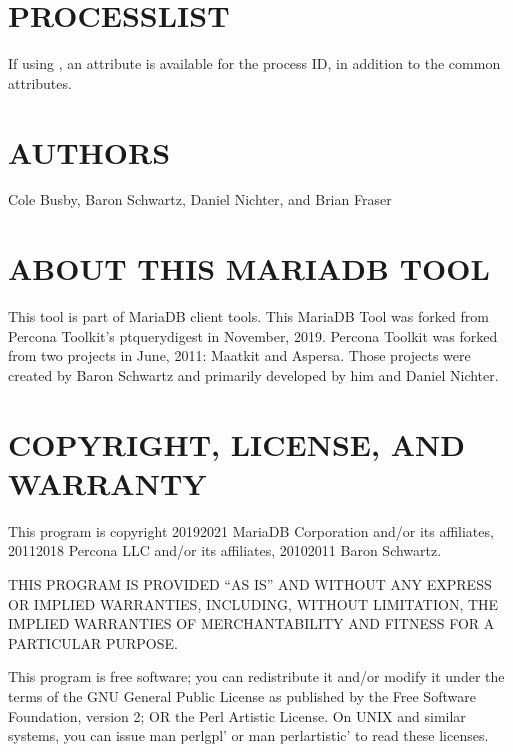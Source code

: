 \documentclass[letterpaper,10pt,english]{sphinxmanual}
\begin{document}
\section{PROCESSLIST}
\label{\detokenize{mariadb-query-digest:processlist}}
\sphinxAtStartPar
If using {\hyperref[\detokenize{mariadb-query-digest:cmdoption-mariadb-query-digest-processlist}]{}}, an  attribute is available for
the process ID, in addition to the common attributes.


\section{AUTHORS}
\label{\detokenize{mariadb-query-digest:authors}}
\sphinxAtStartPar
Cole Busby, Baron Schwartz, Daniel Nichter, and Brian Fraser


\section{ABOUT THIS MARIADB TOOL}
\label{\detokenize{mariadb-query-digest:about-this-mariadb-tool}}
\sphinxAtStartPar
This tool is part of MariaDB client tools. This MariaDB Tool was forked from
Percona Toolkit’s pt\sphinxhyphen{}query\sphinxhyphen{}digest in November, 2019.  Percona Toolkit was
forked from two projects in June, 2011: Maatkit and Aspersa.  Those projects
were created by Baron Schwartz and primarily developed by him and Daniel
Nichter.


\section{COPYRIGHT, LICENSE, AND WARRANTY}
\label{\detokenize{mariadb-query-digest:copyright-license-and-warranty}}
\sphinxAtStartPar
This program is copyright 2019\sphinxhyphen{}2021 MariaDB Corporation and/or its affiliates,
2011\sphinxhyphen{}2018 Percona LLC and/or its affiliates, 2010\sphinxhyphen{}2011 Baron Schwartz.

\sphinxAtStartPar
THIS PROGRAM IS PROVIDED “AS IS” AND WITHOUT ANY EXPRESS OR IMPLIED
WARRANTIES, INCLUDING, WITHOUT LIMITATION, THE IMPLIED WARRANTIES OF
MERCHANTABILITY AND FITNESS FOR A PARTICULAR PURPOSE.

\sphinxAtStartPar
This program is free software; you can redistribute it and/or modify it under
the terms of the GNU General Public License as published by the Free Software
Foundation, version 2; OR the Perl Artistic License.  On UNIX and similar
systems, you can issue \textasciigrave{}man perlgpl’ or \textasciigrave{}man perlartistic’ to read these
licenses.
\end{document}
